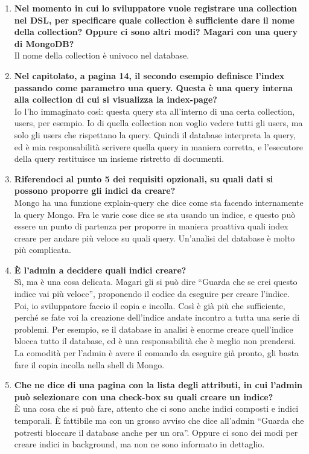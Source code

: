 \begin{enumerate}
		\item
		{\bfseries Nel momento in cui lo sviluppatore vuole registrare una collection nel DSL, per specificare quale collection è sufficiente dare il nome della collection? Oppure ci sono altri modi? Magari con una query di MongoDB?} \\
		Il nome della collection è univoco nel database.
		
		\item
		{\bfseries Nel capitolato, a pagina 14, il secondo esempio definisce l'index passando come parametro una query. Questa è una query interna alla collection di cui si visualizza la index-page?} \\
		Io l'ho immaginato così: questa query sta all'interno di una certa collection, users, per esempio. Io di quella collection non voglio vedere tutti gli users, ma solo gli users che rispettano la query. Quindi il database interpreta la query, ed  è mia responsabilità scrivere quella query in maniera corretta, e l'esecutore della query restituisce un insieme ristretto di documenti.
		
		\item
		{\bfseries Riferendoci al punto 5 dei requisiti opzionali, su quali dati si possono proporre gli indici da creare?} \\
		Mongo ha una funzione explain-query che dice come sta facendo internamente la query Mongo. Fra le varie cose dice se sta usando un indice, e questo può essere un punto di partenza per proporre in maniera proattiva quali index creare per andare più veloce su quali query. Un'analisi del database è molto più complicata.
		
		\item
		{\bfseries È l'admin a decidere quali indici creare?} \\
		Sì, ma è una cosa delicata. Magari gli si può dire ``Guarda che se crei questo indice vai più veloce'', proponendo il codice da eseguire per creare l'indice. Poi, io sviluppatore faccio il copia e incolla. Così è già più che sufficiente, perché se fate voi la creazione dell'indice andate incontro a tutta una serie di problemi. Per esempio, se il database in analisi è enorme creare quell'indice blocca tutto il database, ed è una responsabilità che è meglio non prendersi. La comodità per l'admin è avere il comando da eseguire già pronto, gli basta fare il copia incolla nella shell di Mongo.
		
		\item
		{\bfseries Che ne dice di una pagina con la lista degli attributi, in cui l'admin può selezionare con una check-box su quali creare un indice?} \\
		È una cosa che si può fare, attento che ci sono anche indici composti e indici temporali. È fattibile ma con un grosso avviso che dice all'admin ``Guarda che potresti bloccare il database anche per un ora''. Oppure ci sono dei modi per creare indici in background, ma non ne sono informato in dettaglio.
		

\end{enumerate}
